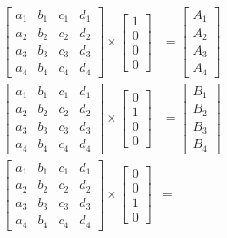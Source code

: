 \documentclass{article}
\begin{document}
\begin{align*}
	\begin{bmatrix}
		a_{1} & b_{1} & c_{1} & d_{1} \\
		a_{2} & b_{2} & c_{2} & d_{2} \\
		a_{3} & b_{3} & c_{3} & d_{3} \\
		a_{4} & b_{4} & c_{4} & d_{4}
	\end{bmatrix}
	\times
	\begin{bmatrix}
		1 \\
		0 \\
		0 \\
		0
	\end{bmatrix}
	&=
	\begin{bmatrix}
		A_{1} \\
		A_{2} \\
		A_{3} \\
		A_{4}
	\end{bmatrix} \\
	\begin{bmatrix}
		a_{1} & b_{1} & c_{1} & d_{1} \\
		a_{2} & b_{2} & c_{2} & d_{2} \\
		a_{3} & b_{3} & c_{3} & d_{3} \\
		a_{4} & b_{4} & c_{4} & d_{4}
	\end{bmatrix}
	\times
	\begin{bmatrix}
		0 \\
		1 \\
		0 \\
		0
	\end{bmatrix}
	&=
	\begin{bmatrix}
		B_{1} \\
		B_{2} \\
		B_{3} \\
		B_{4}
	\end{bmatrix} \\
	\begin{bmatrix}
		a_{1} & b_{1} & c_{1} & d_{1} \\
		a_{2} & b_{2} & c_{2} & d_{2} \\
		a_{3} & b_{3} & c_{3} & d_{3} \\
		a_{4} & b_{4} & c_{4} & d_{4}
	\end{bmatrix}
	\times
	\begin{bmatrix}
		0 \\
		0 \\
		1 \\
		0
	\end{bmatrix}
	&=

\end{align*}
\end{document}
